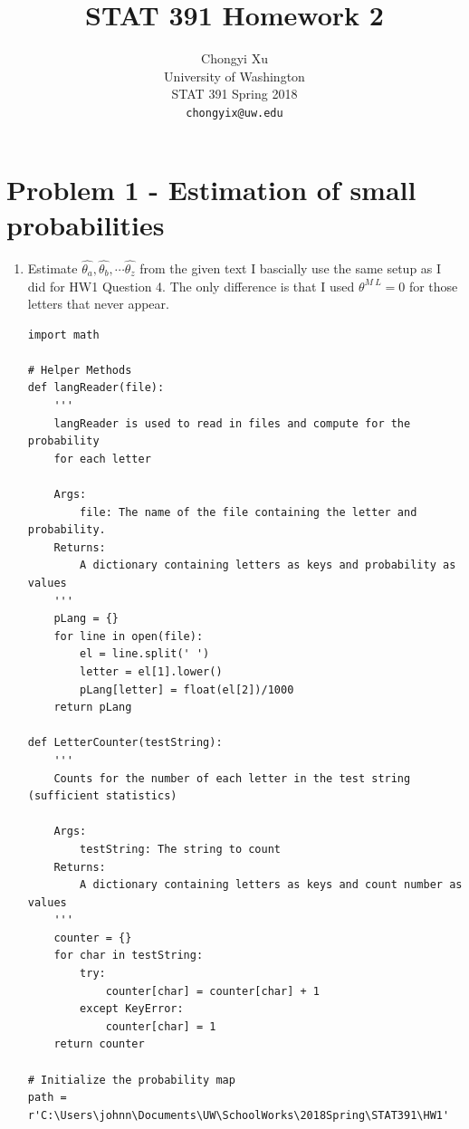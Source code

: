 \documentclass[preprint,12pt]{elsarticle}
\begin{document}
    \title{\LARGE \bf
        STAT 391 Homework 2
        }
        
        \author{ \parbox{3 in}{\centering Chongyi Xu \\
                 University of Washington\\
                 STAT 391 Spring 2018\\
                 {\tt\small chongyix@uw.edu}}
        }
    \maketitle

    \section{Problem 1 - Estimation of small probabilities}
    \begin{enumerate}[label=\alph*]
        \item Estimate $\hat{\theta_a},\hat{\theta_b},\cdots \hat{\theta_z}$ from the given text
        I bascially use the same setup as I did for HW1 Question 4. The only difference is that I
        used $\theta^{M\ L} = 0$ for those letters that never appear. 
        \begin{lstlisting}
import math

# Helper Methods
def langReader(file):
    '''
    langReader is used to read in files and compute for the probability
    for each letter

    Args:
        file: The name of the file containing the letter and probability.
    Returns:
        A dictionary containing letters as keys and probability as values
    '''
    pLang = {}
    for line in open(file):
        el = line.split(' ')
        letter = el[1].lower()
        pLang[letter] = float(el[2])/1000
    return pLang

def LetterCounter(testString):
    '''
    Counts for the number of each letter in the test string (sufficient statistics)

    Args:
        testString: The string to count
    Returns:
        A dictionary containing letters as keys and count number as values
    '''
    counter = {}
    for char in testString:
        try:
            counter[char] = counter[char] + 1
        except KeyError:
            counter[char] = 1
    return counter

# Initialize the probability map
path = r'C:\Users\johnn\Documents\UW\SchoolWorks\2018Spring\STAT391\HW1'


\end{lstlisting}
\end{enumerate}
\end{document}
